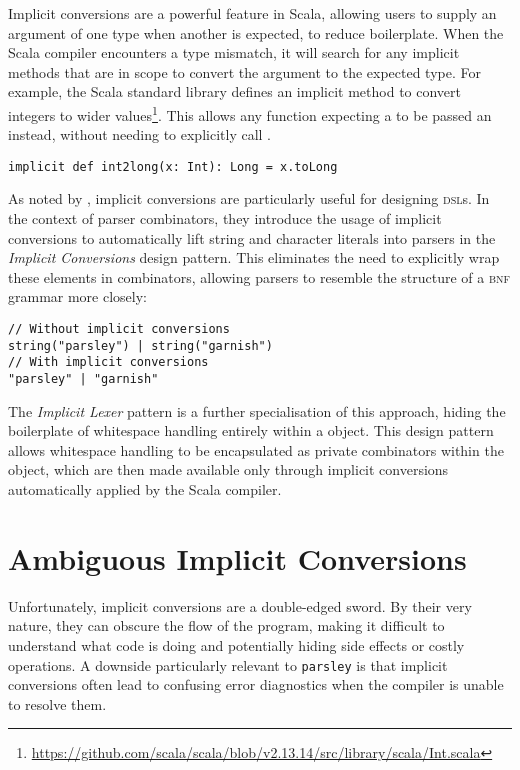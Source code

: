 \documentclass[../../main.tex]{subfiles}
\begin{document}
\label{sec:simple-rules}
Implicit conversions are a powerful feature in Scala, allowing users to supply an argument of one type when another is expected, to reduce boilerplate.
When the Scala compiler encounters a type mismatch, it will search for any implicit methods that are in scope to convert the argument to the expected type.
For example, the Scala standard library defines an implicit method to convert integers to wider  values\footnote{\url{https://github.com/scala/scala/blob/v2.13.14/src/library/scala/Int.scala}}.
This allows any function expecting a  to be passed an  instead, without needing to explicitly call .
\begin{verbatim}
implicit def int2long(x: Int): Long = x.toLong
\end{verbatim}
%
As noted by \textcite{willis_design_2022}, implicit conversions are particularly useful for designing \textsc{dsl}s.
In the context of parser combinators, they introduce the usage of implicit conversions to automatically lift string and character literals into parsers in the \emph{Implicit Conversions} design pattern.
This eliminates the need to explicitly wrap these elements in combinators, allowing parsers to resemble the structure of a \textsc{bnf} grammar more closely:
\begin{verbatim}
// Without implicit conversions
string("parsley") | string("garnish")
// With implicit conversions
"parsley" | "garnish"
\end{verbatim}
%
The \emph{Implicit Lexer} pattern is a further specialisation of this approach, hiding the boilerplate of whitespace handling entirely within a  object.
This design pattern allows whitespace handling to be encapsulated as private combinators within the  object, which are then made available only through implicit conversions automatically applied by the Scala compiler.

\section{Ambiguous Implicit Conversions}\label{sec:ambiguous-implicits}
Unfortunately, implicit conversions are a double-edged sword.
By their very nature, they can obscure the flow of the program, making it difficult to understand what code is doing and potentially hiding side effects or costly operations.
A downside particularly relevant to \texttt{parsley} is that implicit conversions often lead to confusing error diagnostics when the compiler is unable to resolve them.
\end{document}
